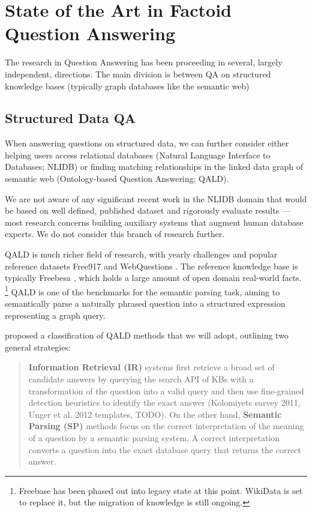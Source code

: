 \chapter{State of the Art in Factoid Question Answering}
\label{ch:survey}

The research in Question Answering has been proceeding in several,
largely independent, directions.  The main division is between QA
on structured knowledge bases (typically graph databases like the
semantic web)


\section{Structured Data QA}
\label{sec:structured}

When answering questions on structured data, we can further
consider either helping users access relational databases (Natural Language Interface to Databases; NLIDB)
or finding matching relationships in the linked data graph of semantic web (Ontology-based Question Answering; QALD).

We are not aware of any significant recent work in the NLIDB domain
that would be based on well defined, published dataset and rigorously
evaluate results --- most research concerns building auxiliary systems
that augment human database experts. \citep{BergamaschiKeymantic, BlunschiSODA}
We do not consider this branch of research further.

QALD is much richer field of research, with yearly challenges \citep{QALD} and
popular reference datasets Free917 \citep{Free917} and WebQuestions \citep{WebQuestions}.
The reference knowledge base is typically Freebesa \citep{Freebase},
which holds a large amount of open domain real-world facts.%
\footnote{Freebase has been phased out into legacy state at this point.
	WikiData is set to replace it, but the migration of knowledge
	is still ongoing.}
QALD is one of the benchmarks for the semantic parsing task, aiming
to semantically parse a naturally phrased question into a structured
expression representing a graph query. \citep{SPBerant2014Paraphrase, Semantic2014Bordes}

\citep{Semantic2014Bordes} proposed a classification of QALD methods
that we will adopt, outlining two general strategies:

\begin{quote}
\textbf{Information
Retrieval (IR)} systems first retrieve a broad set of candidate answers by querying
the search API of KBs with a transformation of the question into a valid
query and then use fine-grained detection heuristics to identify the exact answer
(Kolomiyets survey 2011, Unger et al. 2012 templates, \citep{TreeFreebase2014Yao} TODO).
On the other hand, \textbf{Semantic Parsing (SP)} methods focus on the correct
interpretation of the meaning of a question by a semantic parsing system. A
correct interpretation converts a question into the exact database query that
returns the correct answer. \citep{Semantic2013Berant, SPBerant2014Paraphrase, OQA}
\end{quote}

